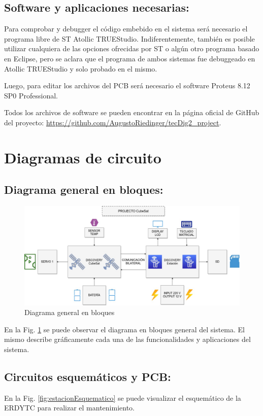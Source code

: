 \documentclass[conference]{IEEEtran}
\begin{document}
\subsection{Software y aplicaciones necesarias:}
\label{sec:org5835b3d}
Para comprobar y debugger el código embebido en el sistema será necesario el programa libre de ST Atollic TRUEStudio. Indiferentemente, también es posible utilizar cualquiera de las opciones ofrecidas por ST o algún otro programa basado en Eclipse, pero se aclara que el programa de ambos sistemas fue debuggeado en Atollic TRUEStudio y solo probado en el mismo.

Luego, para editar los archivos del PCB será necesario el software Proteus 8.12 SP0 Professional.

Todos los archivos de software se pueden encontrar en la página oficial de GitHub del proyecto: \url{https://github.com/AugustoRiedinger/tecDig2\_project}.
\section{Diagramas de circuito}
\label{sec:orgffac52a}
\subsection{Diagrama general en bloques:}
\label{sec:org06a1864}
\begin{figure}[htbp]
\centering
\includegraphics[width=.9\linewidth]{../../images/diagramaBloques.jpg}
\caption{\label{fig:diagramaBloques}Diagrama general en bloques}
\end{figure}

En la Fig. \ref{fig:diagramaBloques} se puede observar el diagrama en bloques general del sistema. El mismo describe gráficamente cada una de las funcionalidades y aplicaciones del sistema.
\subsection{Circuitos esquemáticos y PCB:}
\label{sec:org43b238f}
En la Fig. \ref{fig:estacionEsquematico} se puede visualizar el esquemático de la ERDYTC para realizar el mantenimiento.
\end{document}
